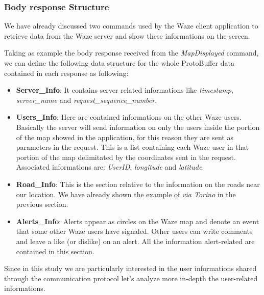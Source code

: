 			\newpage
		\subsubsection{Body response Structure}
			\par We have already discussed two commands used by the Waze client application to retrieve data from the Waze server and show these informations on the screen. \newline
			\par Taking as example the body response received from the \textit{MapDisplayed} command, we can define the following data structure for the whole ProtoBuffer data contained in each response as following:
			\begin{itemize}
				\item \textbf{Server\_Info}: It contains server related informations like \textit{timestamp}, \textit{server\_name} and \textit{request\_sequence\_number}.
				\item \textbf{Users\_Info}: Here are contained informations on the other Waze users. Basically the server will send information on only the users inside the portion of the map showed in the application, for this reason they are sent as parameters in the request. This is a list containing each Waze user in that portion of the map delimitated by the coordinates sent in the request. Associated informations are: \textit{UserID}, \textit{longitude} and \textit{latitude}.
				\item \textbf{Road\_Info}: This is the section relative to the information on the roads near our location. We have already shown the example of \textit{via Torino} in the previous section.
				\item \textbf{Alerts\_Info}: Alerts appear as circles on the Waze map and denote an event that some other Waze users have signaled. Other users can write comments and leave a like (or dislike) on an alert. All the information alert-related are contained in this section.
			\end{itemize}
			\par Since in this study we are particularly interested in the user informations shared through the communication protocol let's analyze more in-depth the user-related informations.
			
\newpage
